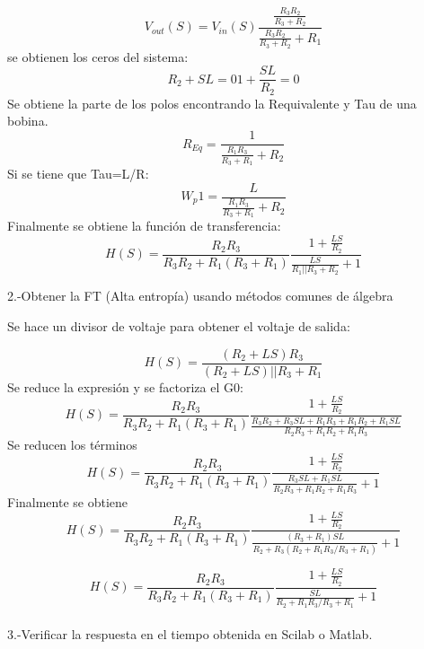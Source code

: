 \documentclass[12pt,letterpaper]{article}     %
\begin{document}
\begin{equation}\label{eq:ej3}
V_{out}(S) = V_{in}(S)\frac{\frac{R_{3}R_{2}}{R_{3}+R_{2}} }{\frac{R_{3}R_{2}}{R_{3}+R_{2}}+R_{1}}
\end{equation}
se obtienen los ceros del sistema:
\begin{equation}\label{eq:ej4}
R_{2}+SL=0
1+ \frac{SL}{R_{2}}  =0
\end{equation}
Se obtiene la parte de los polos encontrando la Requivalente y Tau de una bobina.
\begin{equation}\label{eq:ej5}
R_{Eq} = \frac{1 }{\frac{R_{1}R_{3}}{R_{3}+R_{1}}+R_{2}}
\end{equation}
Si se tiene que Tau=L/R:
\begin{equation}\label{eq:ej6}
W_p1=\frac{L }{\frac{R_{1}R_{3}}{R_{3}+R_{1}}+R_{2}}
\end{equation}
Finalmente se obtiene la función de transferencia:
\begin{equation}\label{eq:ej7}
H(S) = \frac{R_{2}R_{3} }{R_{3}R_{2}+R_{1}(R_{3}+R_{1})} \frac{1+\frac{LS}{R_{2}}}{\frac{LS}{R_{1}||R_{3}+R_{2}}+1}
\end{equation}

2.-Obtener la FT (Alta entropía) usando métodos comunes de álgebra

Se hace un divisor de voltaje para obtener el voltaje de salida:

\begin{equation}\label{eq:ej8}
H(S) = \frac{(R_{2}+LS)R_{3}}{(R_{2}+LS)||R_{3}+R_{1}}
\end{equation}
Se reduce la expresión y se factoriza el G0:
\begin{equation}\label{eq:ej9}
H(S) = \frac{R_{2}R_{3} }{R_{3}R_{2}+R_{1}(R_{3}+R_{1})} \frac{1+\frac{LS}{R_{2}}}{\frac{R_{3}R_{2}+R_{3}SL+R_{1}R_{3}+R_{1}R_{2}+R_{1}SL}{R_{2}R_{3}+R_{1}R_{2}+R_{1}R_{3}}}
\end{equation}
Se reducen los términos
\begin{equation}\label{eq:ej9}
H(S) = \frac{R_{2}R_{3} }{R_{3}R_{2}+R_{1}(R_{3}+R_{1})} \frac{1+\frac{LS}{R_{2}}}{\frac{R_{3}SL+R_{1}SL}{R_{2}R_{3}+R_{1}R_{2}+R_{1}R_{3}}+1}
\end{equation}
Finalmente se obtiene
\begin{equation}\label{eq:ej10}
H(S) = \frac{R_{2}R_{3} }{R_{3}R_{2}+R_{1}(R_{3}+R_{1})} \frac{1+\frac{LS}{R_{2}}}{\frac{(R_{3}+R_{1})SL}{R_{2}+R_{3}(R_{2}+R_{1}R_{3}/R_{3}+R_{1})}+1}
\end{equation}

\begin{equation}\label{eq:ej11}
H(S) = \frac{R_{2}R_{3} }{R_{3}R_{2}+R_{1}(R_{3}+R_{1})} \frac{1+\frac{LS}{R_{2}}}{\frac{SL}{R_{2}+R_{1}R_{3}/R_{3}+R_{1}}+1}
\end{equation}
\\
3.-Verificar la respuesta en el tiempo obtenida en Scilab o Matlab.\\
\end{document}
